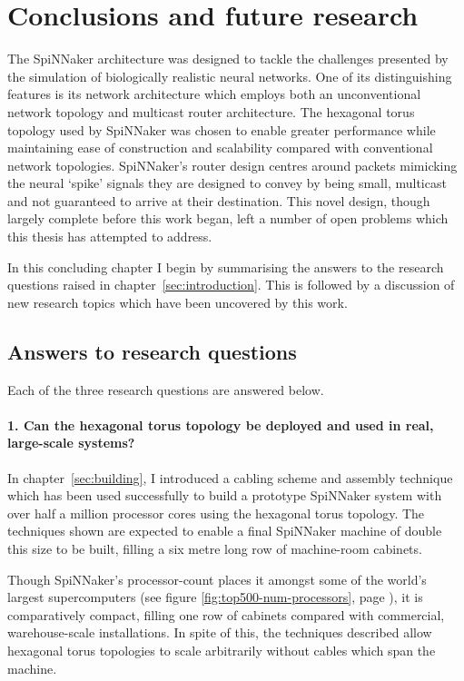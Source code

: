 \chapter{Conclusions and future research}
	
	The SpiNNaker architecture was designed to tackle the challenges presented by
	the simulation of biologically realistic neural networks. One of its
	distinguishing features is its network architecture which employs both an
	unconventional network topology and multicast router architecture. The
	hexagonal torus topology used by SpiNNaker was chosen to enable greater
	performance while maintaining ease of construction and scalability compared
	with conventional network topologies. SpiNNaker's router design centres
	around packets mimicking the neural `spike' signals they are designed to
	convey by being small, multicast and not guaranteed to arrive at their
	destination.  This novel design, though largely complete before this work
	began, left a number of open problems which this thesis has attempted to
	address.
	
	In this concluding chapter I begin by summarising the answers to the research
	questions raised in chapter~\ref{sec:introduction}. This is followed by a
	discussion of new research topics which have been uncovered by this work.
	
	\section{Answers to research questions}
		
		Each of the three research questions are answered below.
		
		\subsubsection{1. Can the hexagonal torus topology be deployed and used in
		real, large-scale systems?}
		
		In chapter~\ref{sec:building}, I introduced a cabling scheme and assembly
		technique which has been used successfully to build a prototype SpiNNaker
		system with over half a million processor cores using the hexagonal torus
		topology. The techniques shown are expected to enable a final SpiNNaker
		machine of double this size to be built, filling a six metre long row of
		machine-room cabinets.
		
		Though SpiNNaker's processor-count places it amongst some of the world's
		largest supercomputers (see figure \ref{fig:top500-num-processors}, page
		\pageref{fig:top500-num-processors}), it is comparatively compact, filling
		one row of cabinets compared with commercial, warehouse-scale
		installations. In spite of this, the techniques described allow hexagonal
		torus topologies to scale arbitrarily without cables which span the
		machine.
		
